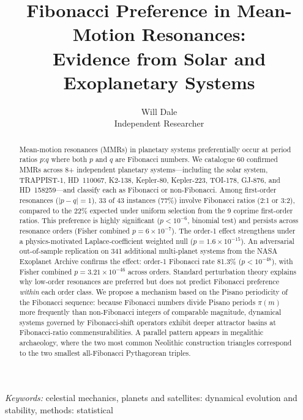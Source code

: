 \documentclass[twocolumn,11pt]{article}
\begin{document}
\title{Fibonacci Preference in Mean-Motion Resonances:\\
Evidence from Solar and Exoplanetary Systems}

\author{Will Dale\\
\small Independent Researcher}
\date{}
\maketitle

\begin{abstract}
Mean-motion resonances (MMRs) in planetary systems preferentially
occur at period ratios $p$:$q$ where both $p$ and $q$ are Fibonacci
numbers.  We catalogue 60 confirmed MMRs across 8+ independent
planetary systems---including the solar system, TRAPPIST-1, HD~110067,
K2-138, Kepler-80, Kepler-223, TOI-178, GJ-876, and HD~158259---and
classify each as Fibonacci or non-Fibonacci.  Among first-order
resonances ($|p-q|=1$), 33 of 43 instances (77\%) involve Fibonacci
ratios (2:1 or 3:2), compared to the 22\% expected under uniform
selection from the 9 coprime first-order ratios.  This preference is
highly significant ($p < 10^{-6}$, binomial test) and persists across
resonance orders (Fisher combined $p = 6 \times 10^{-7}$).
The order-1 effect strengthens under a physics-motivated
Laplace-coefficient weighted null ($p = 1.6 \times 10^{-15}$).
An adversarial out-of-sample replication on 341 additional
multi-planet systems from the NASA Exoplanet Archive confirms the
effect: order-1 Fibonacci rate 81.3\% ($p < 10^{-48}$), with Fisher
combined $p = 3.21 \times 10^{-46}$ across orders.  Standard
perturbation theory explains why low-order resonances are preferred
but does not predict Fibonacci preference \emph{within} each order
class.  We propose a mechanism based on the Pisano periodicity of the
Fibonacci sequence: because Fibonacci numbers divide Pisano periods
$\pi(m)$ more frequently than non-Fibonacci integers of comparable
magnitude, dynamical systems governed by Fibonacci-shift operators
exhibit deeper attractor basins at Fibonacci-ratio commensurabilities.
A parallel pattern appears in megalithic archaeology, where the two
most common Neolithic construction triangles correspond to the two
smallest all-Fibonacci Pythagorean triples.
\end{abstract}

\noindent\textit{Keywords:} celestial mechanics, planets and satellites: dynamical evolution and stability, methods: statistical

\end{document}
